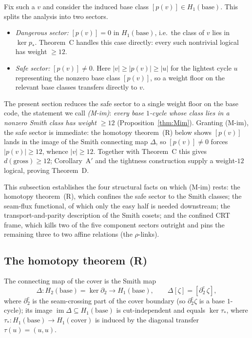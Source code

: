 \documentclass[11pt]{article}
\newcommand{\wt}[1]{\lvert #1\rvert}
\DeclareMathOperator{\img}{im}
\newcommand{\dcut}{\partial_2^{\mathrm{c}}}     %
\newcommand{\cmap}{\Delta}                       %
\theoremstyle{plain}
\theoremstyle{definition}
\theoremstyle{remark}
\begin{document}
Fix such a $v$ and consider the induced base class $[p(v)]\in H_1(\mathrm{base})$.
This splits the analysis into two sectors.

\begin{itemize}
\item \emph{Dangerous sector:} $[p(v)]=0$ in $H_1(\mathrm{base})$, i.e.\ the
class of $v$ lies in $\ker p_\ast$. Theorem~C handles this case directly:
every such nontrivial logical has weight $\ge 12$.
\item \emph{Safe sector:} $[p(v)]\ne 0$. Here $\wt v\ge\wt{p(v)}\ge\wt{u}$ for
the lightest cycle $u$ representing the nonzero base class $[p(v)]$, so a weight
floor on the relevant base classes transfers directly to $v$.
\end{itemize}

The present section reduces the safe sector to a single weight floor on the base
code, the statement we call \emph{(M-im)}: \emph{every base $1$-cycle whose class
lies in a nonzero Smith class has weight $\ge 12$} (Proposition~\ref{thm:Mim}). Granting
(M-im), the safe sector is immediate: the homotopy theorem~(R) below shows
$[p(v)]$ lands in the image of the Smith connecting map $\cmap$, so $[p(v)]\ne 0$
forces $\wt{p(v)}\ge 12$, whence $\wt v\ge 12$. Together with Theorem~C this gives
$d(\mathrm{gross})\ge 12$; Corollary~A$'$ and the tightness construction supply a
weight-$12$ logical, proving Theorem~D.

This subsection establishes the four structural facts on which (M-im) rests: the
homotopy theorem~(R), which confines the safe sector to the Smith classes; the
seam-flux functional, of which only the easy half is needed downstream; the
transport-and-parity description of the Smith cosets; and the confined CRT frame,
which kills two of the five component sectors outright and pins the remaining
three to two affine relations (the $\rho$-links).

\subsection{The homotopy theorem (R)}\label{thm:R}

The connecting map of the cover is the Smith map
\[
  \cmap\colon H_2(\mathrm{base})=\ker\partial_2\longrightarrow H_1(\mathrm{base}),
  \qquad \cmap[\zeta]=[\dcut\,\zeta],
\]
where $\dcut$ is the seam-crossing part of the cover boundary (so $\dcut\zeta$ is a base
$1$-cycle); its image $\img\cmap\subseteq H_1(\mathrm{base})$ is cut-independent and equals
$\ker\tau_\ast$, where $\tau_\ast\colon H_1(\mathrm{base})\to H_1(\mathrm{cover})$ is induced
by the diagonal transfer $\tau(u)=(u,u)$.
\end{document}
